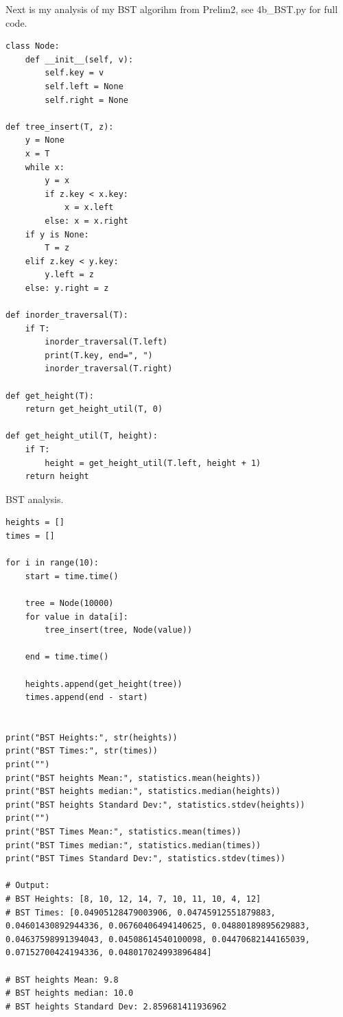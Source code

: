 \documentclass{article}
\begin{document}
\begin{enumerate}
\begin{enumerate}
      Next is my analysis of my BST algorihm from Prelim2, see 4b\_BST.py for full code.

    \begin{lstlisting}
class Node: 
    def __init__(self, v): 
        self.key = v 
        self.left = None
        self.right = None
                
def tree_insert(T, z): 
    y = None
    x = T
    while x:
        y = x
        if z.key < x.key:
            x = x.left
        else: x = x.right
    if y is None:
        T = z
    elif z.key < y.key:
        y.left = z
    else: y.right = z
                
def inorder_traversal(T): 
    if T: 
        inorder_traversal(T.left) 
        print(T.key, end=", ") 
        inorder_traversal(T.right)
        
def get_height(T):
    return get_height_util(T, 0)

def get_height_util(T, height):
    if T:
        height = get_height_util(T.left, height + 1)
    return height
    \end{lstlisting}

    BST analysis.

    \begin{lstlisting}
heights = []
times = []

for i in range(10):
    start = time.time()
    
    tree = Node(10000)
    for value in data[i]:
        tree_insert(tree, Node(value))
    
    end = time.time()
    
    heights.append(get_height(tree))
    times.append(end - start)

    
print("BST Heights:", str(heights))
print("BST Times:", str(times))
print("")
print("BST heights Mean:", statistics.mean(heights))
print("BST heights median:", statistics.median(heights))
print("BST heights Standard Dev:", statistics.stdev(heights))
print("")
print("BST Times Mean:", statistics.mean(times))
print("BST Times median:", statistics.median(times))
print("BST Times Standard Dev:", statistics.stdev(times))

# Output:
# BST Heights: [8, 10, 12, 14, 7, 10, 11, 10, 4, 12]
# BST Times: [0.04905128479003906, 0.04745912551879883, 0.04601430892944336, 0.06760406494140625, 0.04880189895629883, 0.04637598991394043, 0.04508614540100098, 0.04470682144165039, 0.07152700424194336, 0.048017024993896484]

# BST heights Mean: 9.8
# BST heights median: 10.0
# BST heights Standard Dev: 2.859681411936962


\end{lstlisting}
\end{enumerate}
\end{enumerate}
\end{document}

